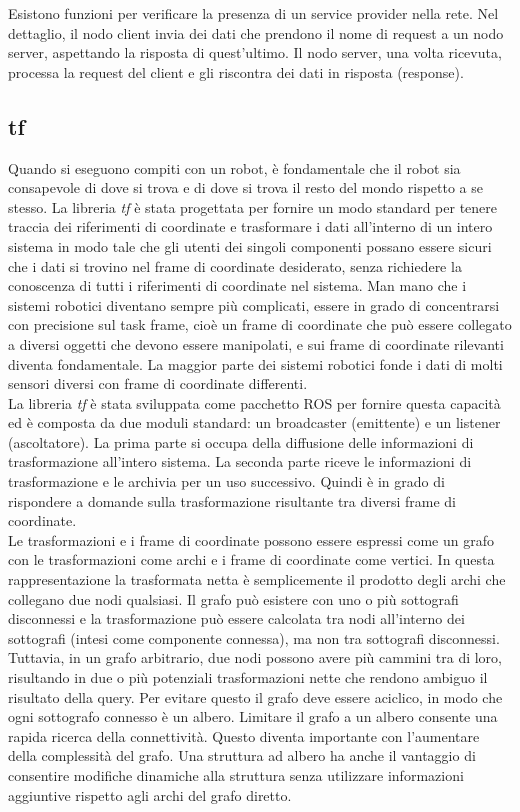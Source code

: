 Esistono funzioni per verificare la presenza di un service provider nella rete. Nel dettaglio, il nodo client invia dei dati che prendono il nome di request a un nodo server, aspettando la risposta di quest’ultimo. Il nodo server, una volta ricevuta, processa la request del client e gli riscontra dei dati in risposta (response).

\subsection{tf}
Quando si eseguono compiti con un robot, è fondamentale che il robot sia consapevole di dove si trova e di dove si trova il resto del mondo rispetto a se stesso. La libreria \emph{tf} \cite{tf} è stata progettata per fornire un modo standard per tenere traccia dei riferimenti di coordinate e trasformare i dati all'interno di un intero sistema in modo tale che gli utenti dei singoli componenti possano essere sicuri che i dati si trovino nel frame di coordinate desiderato, senza richiedere la conoscenza di tutti i riferimenti di coordinate nel sistema. Man mano che i sistemi robotici diventano sempre più complicati, essere in grado di concentrarsi con precisione sul task frame, cioè un frame di coordinate che può essere collegato a diversi oggetti che devono essere manipolati, e sui frame di coordinate rilevanti diventa fondamentale. La maggior parte dei sistemi robotici fonde i dati di molti sensori diversi con frame di coordinate differenti.\\

La libreria \emph{tf} è stata sviluppata come pacchetto \acs{ROS} per fornire questa capacità ed è composta da due moduli standard: un broadcaster (emittente) e un listener (ascoltatore). La prima parte si occupa della diffusione delle informazioni di trasformazione all'intero sistema. La seconda parte riceve le informazioni di trasformazione e le archivia per un uso successivo. Quindi è in grado di rispondere a domande sulla trasformazione risultante tra diversi frame di coordinate.\\

Le trasformazioni e i frame di coordinate possono essere espressi come un grafo con le trasformazioni come archi e i frame di coordinate come vertici. In questa rappresentazione la trasformata netta è semplicemente il prodotto degli archi che collegano due nodi qualsiasi. Il grafo può esistere con uno o più sottografi disconnessi e la trasformazione può essere calcolata tra nodi all'interno dei sottografi (intesi come componente connessa), ma non tra sottografi disconnessi. Tuttavia, in un grafo arbitrario, due nodi possono avere più cammini tra di loro, risultando in due o più potenziali trasformazioni nette che rendono ambiguo il risultato della query. Per evitare questo il grafo deve essere aciclico, in modo che ogni sottografo connesso è un albero. Limitare il grafo a un albero consente una rapida ricerca della connettività. Questo diventa importante con l'aumentare della complessità del grafo. Una struttura ad albero ha anche il vantaggio di consentire modifiche dinamiche alla struttura senza utilizzare informazioni aggiuntive rispetto agli archi del grafo diretto.\\

